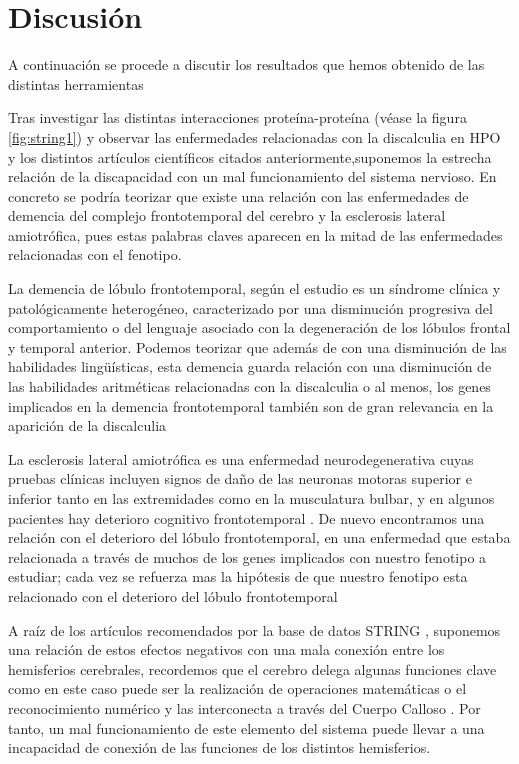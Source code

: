 \newpage

\section{Discusión}

\hfill

A continuación se procede a discutir los resultados que hemos obtenido de las distintas herramientas

\hfill

Tras investigar las distintas interacciones proteína-proteína (véase la figura \ref{fig:string1}) y observar las enfermedades relacionadas con la discalculia en HPO y los distintos artículos científicos citados anteriormente,suponemos la estrecha relación de la discapacidad con un mal funcionamiento del sistema nervioso. En concreto se podría teorizar que existe una relación con las enfermedades de demencia del complejo frontotemporal del cerebro y la esclerosis lateral amiotrófica, pues estas palabras claves aparecen en la mitad de las enfermedades relacionadas con el fenotipo.

\hfill

La demencia de lóbulo frontotemporal, según el estudio \cite{FrontotemoralDementia} es un síndrome clínica y patológicamente heterogéneo, caracterizado por una disminución progresiva del comportamiento o del lenguaje asociado con la degeneración de los lóbulos frontal y temporal anterior. Podemos teorizar que además de con una disminución de las habilidades lingüísticas, esta demencia guarda relación con una disminución de las habilidades aritméticas relacionadas con la discalculia o al menos, los genes implicados en la demencia frontotemporal también son de gran relevancia en la aparición de la discalculia

\hfill

La esclerosis lateral amiotrófica es una enfermedad neurodegenerativa cuyas  pruebas clínicas incluyen signos de daño de las neuronas motoras superior e inferior tanto en las extremidades como en la musculatura bulbar, y en algunos pacientes hay deterioro cognitivo frontotemporal \cite{EsclerosisLateraAmiotrófica}. De nuevo encontramos una relación con el deterioro del lóbulo frontotemporal, en una enfermedad que estaba relacionada a través de muchos de los genes implicados con nuestro fenotipo a estudiar; cada vez se refuerza mas la hipótesis de que nuestro fenotipo esta relacionado con el deterioro del lóbulo frontotemporal

\hfill

A raíz de los artículos recomendados por la base de datos STRING \cite{Walterfang2014,frontotemporal}, suponemos una relación de estos efectos negativos con una mala conexión entre los hemisferios cerebrales, recordemos que el cerebro delega algunas funciones clave como en este caso puede ser la realización de operaciones matemáticas o el reconocimiento numérico y las interconecta a través del Cuerpo Calloso \cite{CorpusCallosum}. Por tanto, un mal funcionamiento de este elemento del sistema puede llevar a una incapacidad de conexión de las funciones de los distintos hemisferios.

\hfill






\newpage